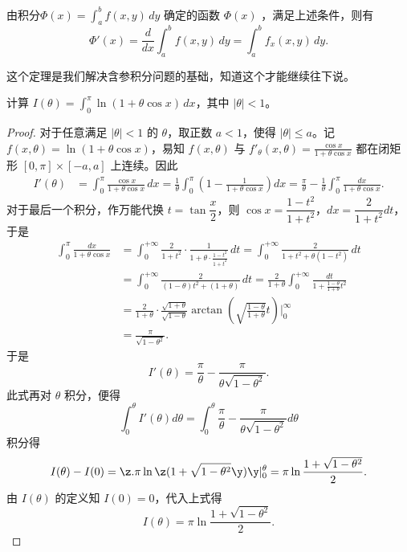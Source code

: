 \begin{lemma}
   由积分$\displaystyle \Phi(x) = \int_{a}^{b} f(x,y)  \, dy$
   确定的函数 $\Phi(x)$ ，满足上述条件，则有
    \[
    \Phi'(x) = \frac{d}{dx} \int_{a}^{b} f(x,y)  \, dy
    = \int_{a}^{b} f_x(x,y)  \, dy.\]
\end{lemma}

这个定理是我们解决含参积分问题的基础，知道这个才能继续往下说。
\vspace{2mm}

\begin{example}[（紫书6.3.18）]
    计算 $\displaystyle I(\theta) = \int_{0}^{\pi} \ln(1 + \theta \cos x) \, dx$，其中 $|\theta| < 1$。
\end{example}

\begin{proof}
    对于任意满足 $|\theta| < 1$ 的 $\theta$，取正数 $a < 1$，使得 $|\theta| \leq a$。记 $f(x, \theta) = \ln(1 + \theta \cos x)$，易知 $f(x, \theta)$ 与
    $\displaystyle f'_{\theta}(x, \theta) = \frac{\cos x}{1 + \theta \cos x}$ 都在闭矩形 $[0, \pi] \times [-a, a]$ 上连续。因此
    \begin{align*}
        I'(\theta) &= \int_{0}^{\pi} \frac{\cos x}{1 + \theta \cos x} \, dx 
        = \frac{1}{\theta} \int_{0}^{\pi} \left( 1 - \frac{1}{1 + \theta \cos x} \right) dx 
        = \frac{\pi}{\theta} - \frac{1}{\theta} \int_{0}^{\pi} \frac{dx}{1 + \theta \cos x}.
    \end{align*}
    对于最后一个积分，作万能代换 $t = \tan \dfrac{x}{2}$，则 $\cos x = \dfrac{1 - t^2}{1 + t^2}$，$dx = \dfrac{2}{1 + t^2} dt$，于是
    \begin{align*}
        \int_{0}^{\pi} \frac{dx}{1 + \theta \cos x}
        &= \int_{0}^{+\infty} \frac{2}{1 + t^2} \cdot \frac{1}{1 + \theta \cdot \frac{1 - t^2}{1 + t^2}} \, dt 
        = \int_{0}^{+\infty} \frac{2}{1 + t^2 + \theta (1 - t^2)} \, dt \\
        &= \int_{0}^{+\infty} \frac{2}{(1 - \theta)t^2 + (1 + \theta)} \, dt 
        = \frac{2}{1 + \theta} \int_{0}^{+\infty} \frac{dt}{1 + \frac{1 - \theta}{1 + \theta} t^2} \\
        &= \frac{2}{1 + \theta} \cdot \frac{\sqrt{1 + \theta}}{\sqrt{1 - \theta}} \arctan\left( \sqrt{\frac{1 - \theta}{1 + \theta}} t \right) \bigg|_{0}^{\infty} \\
        &= \frac{\pi}{\sqrt{1 - \theta^2}}.
    \end{align*}
    于是
    \[
        I'(\theta) = \frac{\pi}{\theta} - \frac{\pi}{\theta \sqrt{1 - \theta^2}}.
    \]
    此式再对 $\theta$ 积分，便得
    \[ \int_{0}^{\theta} I'(\theta) d\theta = \int_{0}^{\theta} \frac{\pi}
       {\theta} - \frac{\pi}{\theta \sqrt{1 - \theta^2}} d\theta \]
   积分得
    \[
        I(\theta) - I(0) = \z. \pi \ln\z(1 + \sqrt{1 - \theta^2}\y) \y|^{\theta}_{0}=\pi \ln\frac{1 + \sqrt{1 - \theta^2}}{2}.
    \]
    由 $I(\theta)$ 的定义知 $I(0) = 0$，代入上式得
    \[
        I(\theta) = \pi \ln \frac{1 + \sqrt{1 - \theta^2}}{2}.
    \]
\end{proof}

